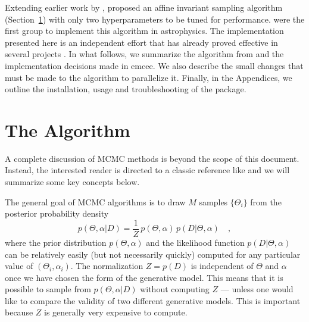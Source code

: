 \documentclass[12pt,preprint]{aastex}
\newcommand{\project}[1]{{\sffamily #1}}
\newcommand{\thisplain}{emcee}
\newcommand{\this}{\project{\thisplain}}
\newcommand{\paper}{document}
\newcommand{\Sect}[1]{Section~\ref{sect:#1}}
\newcommand{\sect}[1]{\Sect{#1}}
\newcommand{\sectlabel}[1]{\label{sect:#1}}
\renewcommand{\vector}[1]{#1}
\newcommand{\pr}[1]{\ensuremath{p(#1)}}
\newcommand{\model}{\ensuremath{\vector{\Theta}}}
\newcommand{\data}{\ensuremath{\vector{D}}}
\newcommand{\nuisance}{\ensuremath{\vector{\alpha}}}
\begin{document}
Extending earlier work by \citet{Christen:2007},
\citet[][hereafter ]{Goodman:2010} proposed an
affine invariant sampling
algorithm (\sect{algo}) with only two hyperparameters to be tuned for
performance. \citet{Hou:2011} were the first group to implement this
algorithm in astrophysics. The implementation presented here is
an independent effort that has already proved effective in several projects
\citep[][Foreman-Mackey \& Widrow\ 2012, in prep.]{Lang:2011,
Bovy:2011, Dorman:2012}.
In what follows, we summarize the
algorithm from  and the implementation
decisions made in \this. We also describe the small changes
that must be made to the algorithm to parallelize it. Finally, in the
Appendices, we outline the installation, usage and troubleshooting of
the package.

\section{The Algorithm}\sectlabel{algo}

A complete discussion of MCMC methods is beyond the scope of this \paper.
Instead, the interested reader is directed to a classic reference like
\citet{MacKay:2003} and we will summarize some key concepts below.

The general goal of MCMC algorithms is to draw $M$ samples
$\{ \model_i \}$ from
the posterior probability density
\begin{equation}
    \pr{\model, \nuisance | \data} = \frac{1}{Z}\,\pr{\model, \nuisance}
            \, \pr{\data | \model, \nuisance} \quad,
\end{equation}
where the prior distribution $\pr{\model, \nuisance}$ and the likelihood
function $\pr{\data|\model,\nuisance}$ can be relatively easily (but not
necessarily quickly) computed for any particular value of
$(\model_i, \nuisance_i)$.  The normalization $Z=\pr{\data}$ is
independent of $\model$ and $\nuisance$ once we have chosen the form of the
generative model. This means that it is possible
to sample from \pr{\model, \nuisance | \data} without computing $Z$ ---
unless one would like to compare the validity of two different generative
models. This is important because $Z$ is generally very expensive to
compute.
\end{document}
